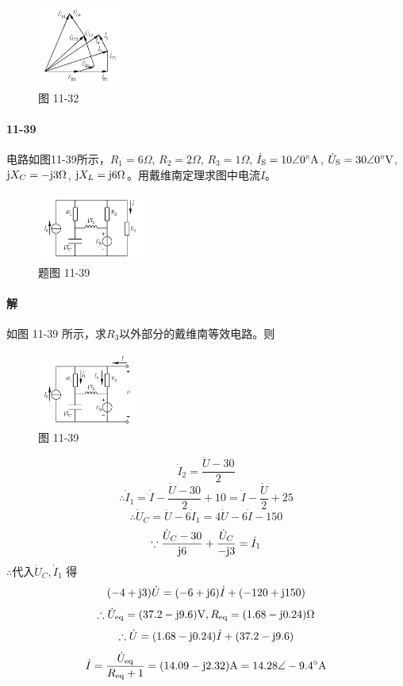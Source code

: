 \documentclass[hyperref, UTF8]{ctexart}
\newcommand{\volt}{{\rm V}}
\newcommand{\source}{{\rm S}}
\newcommand{\ampere}{{\rm A}}
\newcommand{\ohm}{\Omega}
\newcommand{\degree}{^{\circ}}
\newcommand{\J}{{\rm j}}
\begin{document}
\begin{figure}[!htb]
\centering
\includegraphics[width=0.245\textwidth]{p11-32-sol.png}
\caption*{图 11-32}
\end{figure}

\paragraph{11-39}\label{11-39}
电路如图11-39所示，$R_1=6\ohm$, $R_2=2\ohm$, $R_3=1\ohm$, $\dot{I}_\source=10\angle 0\degree \ampere$, $\dot{U}_\source=30\angle 0\degree \volt$, $\J X_C=-\J 3\ohm$, $\J X_L = \J 6\ohm$。用戴维南定理求图中电流$\dot{I}$。

\begin{figure}[!htb]
\centering
\includegraphics[width=0.318\textwidth]{p11-39.png}
\caption*{题图 11-39}
\end{figure}

\paragraph{解} 如图 11-39 所示，求$R_3$以外部分的戴维南等效电路。则

\begin{figure}[!htb]
\centering
\includegraphics[width=0.294\textwidth]{p11-39-sol.png}
\caption*{图 11-39}

\end{figure}
 $$ \dot I _2 = \frac{ \dot U -30}{2} $$
 $$ \therefore \dot I _1 = \dot I - \frac{ \dot U -30}{2} + 10 = \dot I - \frac{ \dot U }{2} + 25 $$
 $$ \therefore \dot U _C = \dot U - 6 \dot I _1 = 4 \dot U - 6 \dot I - 150 $$
 $$ \because \frac{ \dot U _C - 30}{ \J 6} + \frac{ \dot U _C}{- \J 3} = \dot I _1 $$
 $ \therefore \text{代入} \dot U _C, \dot I _1$ 得
 $$ (-4+ \J 3) \dot U = (-6+ \J 6) \dot I +(-120+ \J 150) $$
 $$ \therefore \dot U_{\rm eq}=(37.2-\J 9.6) \volt, R_{\rm eq} = (1.68 - \J 0.24) \ohm $$
 $$ \therefore \dot U = (1.68 - \J 0.24) \dot I +(37.2-\J 9.6) $$
 $$  \dot I = \frac{ \dot U _{\rm eq}}{R_{\rm eq}+1} = (14.09 - \J 2.32) \ampere = 14.28\angle -9.4 \degree \ampere $$
\end{document}
